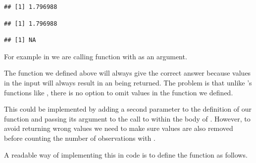 \documentclass[krantz2]{krantz}\usepackage{knitr}
\begin{document}
\begin{knitrout}\footnotesize
{}\color{fgcolor}\begin{kframe}
\begin{alltt}
 \hlkwb{<-} \hlstd{(}\hlstd{,} \hlstd{,} \hlstd{,} \hlopt{-}\hlstd{)}
 \hlkwb{<-}  \hlstd{)}
\hlstd{(} 
\end{alltt}
\begin{verbatim}
## [1] 1.796988
\end{verbatim}
\begin{alltt}
\end{alltt}
\begin{verbatim}
## [1] 1.796988
\end{verbatim}
\begin{alltt}
\end{alltt}
\begin{verbatim}
## [1] NA
\end{verbatim}
\end{kframe}
\end{knitrout}

For example in  we are calling function  with  as an argument.

The function we defined above will always give the correct answer because  values in the input will always result in an  being returned. The problem is that unlike \Rlang's functions like , there is no option to omit  values in the function we defined.

This could be implemented by adding a second parameter  to the definition of our function and passing its argument to the call to  within the body of . However, to avoid returning wrong values we need to make sure  values are also removed before counting the number of observations with .

A readable way of implementing this in code is to define the function as follows.

\begin{knitrout}\footnotesize
{}\color{fgcolor}\begin{kframe}
\begin{alltt}
 \hlkwb{<-} \hlstd{(}\hlstd{,}  \hlstd{=} \hlstd{) \{}
  
    \hlkwb{<-} 
 \hlstd{\}}
 \hlstd{(}\hlopt{/}
\hlstd{\}}
\end{alltt}
\end{kframe}
\end{knitrout}
\end{document}
